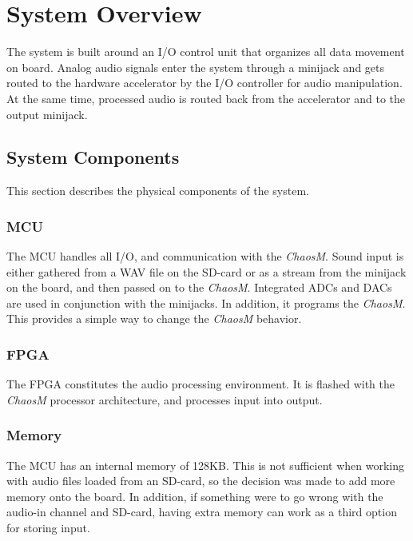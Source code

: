 
\section{System Overview}

The system is built around an I/O control unit that organizes all data movement
on board. Analog audio signals enter the system through a minijack and gets
routed to the hardware accelerator by the I/O controller for audio manipulation.
At the same time, processed audio is routed back from the accelerator and to the
output minijack.

\subsection{System Components}
This section describes the physical components of the system.

\subsubsection{MCU}\label{intro:system-components-mcu}

The MCU handles all I/O, and communication with the \textit{ChaosM}.
Sound input is either gathered from a WAV file on the SD-card or as
a stream from the minijack on the board, and then passed on to the
\textit{ChaosM}. Integrated ADCs and DACs are used in conjunction with the
minijacks. In addition, it programs the \textit{ChaosM}. This provides a simple way to
change the \textit{ChaosM} behavior.

\subsubsection{FPGA}

The FPGA constitutes the audio processing environment. It is flashed with the
\textit{ChaosM} processor architecture, and processes input into output.

\subsubsection{Memory}

The MCU has an internal memory of 128KB. This is not sufficient when working
with audio files loaded from an SD-card, so the decision was made to add more
memory onto the board. In addition, if something were to go wrong with the
audio-in channel and SD-card, having extra memory can work as a third option for
storing input.

